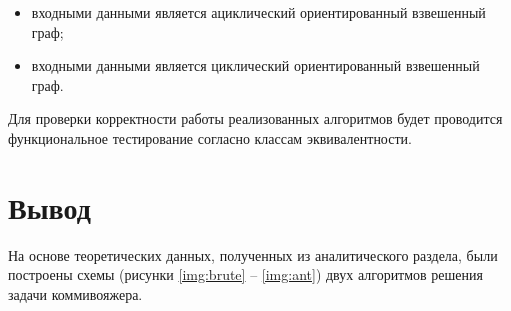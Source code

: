 \begin{itemize}
    \item входными данными является ациклический ориентированный взвешенный граф;
    \item входными данными является циклический ориентированный взвешенный граф.
\end{itemize}

Для проверки корректности работы реализованных алгоритмов будет проводится функциональное тестирование согласно классам эквивалентности.

\section{Вывод}

На основе теоретических данных, полученных из аналитического раздела,
были построены схемы (рисунки \ref{img:brute} -- \ref{img:ant}) двух алгоритмов решения задачи коммивояжера.